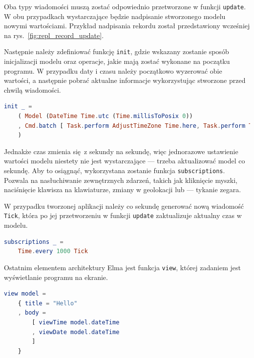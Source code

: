 \documentclass[twoside,a4paper]{report}
\begin{document}
Oba typy wiadomości muszą zostać odpowiednio przetworzone w funkcji \texttt{update}.
W obu przypadkach wystarczające będzie nadpisanie stworzonego modelu nowymi wartościami.
Przykład nadpisania rekordu został przedstawiony wcześniej na rys.~\ref{fig:repl_record_update}.

Następnie należy zdefiniować funkcję \texttt{init}, gdzie wskazany zostanie sposób inicjalizacji modelu oraz operacje, jakie mają zostać wykonane na początku programu.
W przypadku daty i czasu należy początkowo wyzerować obie wartości, a następnie pobrać aktualne informacje wykorzystując stworzone przed chwilą wiadomości.

\begin{lstlisting}[language=Elm]
init _ =
    ( Model (DateTime Time.utc (Time.millisToPosix 0))
    , Cmd.batch [ Task.perform AdjustTimeZone Time.here, Task.perform Tick Time.now ]
    )
\end{lstlisting}

Jednakże czas zmienia się z sekundy na sekundę, więc jednorazowe ustawienie wartości modelu niestety nie jest wystarczające --- trzeba aktualizować model co sekundę.
Aby to osiągnąć, wykorzystana zostanie funkcja \texttt{subscriptions}.
Pozwala na nasłuchiwanie zewnętrznych zdarzeń, takich jak kliknięcie myszki, naciśnięcie klawisza na klawiaturze, zmiany w geolokacji lub --- tykanie zegara.

W przypadku tworzonej aplikacji należy co sekundę generować nową wiadomość \texttt{Tick}, która po jej przetworzeniu w funkcji \texttt{update} zaktualizuje aktualny czas w modelu.

\begin{lstlisting}[language=Elm]
subscriptions _ =
    Time.every 1000 Tick
\end{lstlisting}

Ostatnim elementem architektury Elma jest funkcja \texttt{view}, której zadaniem jest wyświetlanie programu na ekranie.

\begin{lstlisting}[language=Elm]
view model =
    { title = "Hello"
    , body =
        [ viewTime model.dateTime
        , viewDate model.dateTime
        ]
    }
\end{lstlisting}
\end{document}
